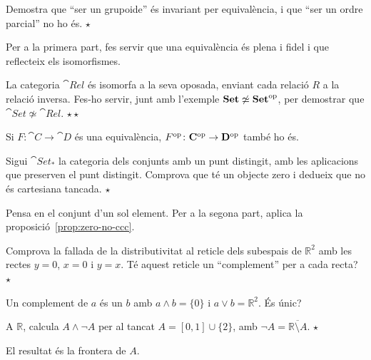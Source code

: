 \begin{exercici}
Demostra que \enquote{ser un grupoide} és invariant per equivalència, i que \enquote{ser un ordre parcial} no ho és. \hfill{\normalfont$\star$}
\begin{indicacio}
Per a la primera part, fes servir que una equivalència és plena i fidel i que reflecteix els isomorfismes.
\end{indicacio}
\end{exercici}

\begin{exercici}
La categoria $\cat{Rel}$ és isomorfa a la seva oposada, enviant cada relació $R$ a la relació inversa. Fes-ho servir, junt amb l'exemple $\mathbf{Set}\not\simeq\mathbf{Set}^{\mathrm{op}}$, per demostrar que $\cat{Set}\not\simeq\cat{Rel}$. \hfill{\normalfont$\star\star$}
\begin{indicacio}
Si $F\colon\cat{C}\to\cat{D}$ és una equivalència, $F^{\mathrm{op}}\colon\mathbf{C}^{\mathrm{op}}\to\mathbf{D}^{\mathrm{op}}$ també ho és.
\end{indicacio}
\end{exercici}

\begin{exercici}
Sigui $\cat{Set}_\ast$ la categoria dels conjunts amb un punt distingit, amb les aplicacions que preserven el punt distingit. Comprova que té un objecte zero i dedueix que no és cartesiana tancada. \hfill{\normalfont$\star$}
\begin{indicacio}
Pensa en el conjunt d'un sol element. Per a la segona part, aplica la proposició~\ref{prop:zero-no-ccc}.
\end{indicacio}
\end{exercici}

\begin{exercici}
Comprova la fallada de la distributivitat al reticle dels subespais de $\mathbb R^2$ amb les rectes $y=0$, $x=0$ i $y=x$. Té aquest reticle un \enquote{complement} per a cada recta? \hfill{\normalfont$\star$}
\begin{indicacio}
Un complement de $a$ és un $b$ amb $a\wedge b=\{0\}$ i $a\vee b=\mathbb R^2$. És únic?
\end{indicacio}
\end{exercici}

\begin{exercici}
A $\mathbb R$, calcula $A\wedge\neg A$ per al tancat $A=[0,1]\cup\{2\}$, amb $\neg A=\overline{\mathbb R\setminus A}$. \hfill{\normalfont$\star$}
\begin{indicacio}
El resultat és la frontera de $A$.
\end{indicacio}
\end{exercici}
